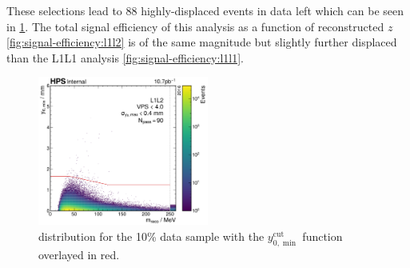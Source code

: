 These selections lead to 88
highly-displaced events in data left which can be seen in \cref{fig:y0-cut-on-data}.
The total signal efficiency of this analysis as a function of reconstructed $z$
\cref{fig:signal-efficiency:l1l2} is of the same magnitude but slightly further displaced
than the L1L1 analysis \cref{fig:signal-efficiency:l1l1}.

\begin{figure}
  \centering
  \includegraphics[width=0.5\textwidth]{figures/hps/analysis/results/y0-cut-on-data.pdf}
  \caption{\minyzero distribution for the 10\% data sample with the
  $y_{0,\min}^\mathrm{cut}$ function overlayed in red.}
  \label{fig:y0-cut-on-data}
\end{figure}

